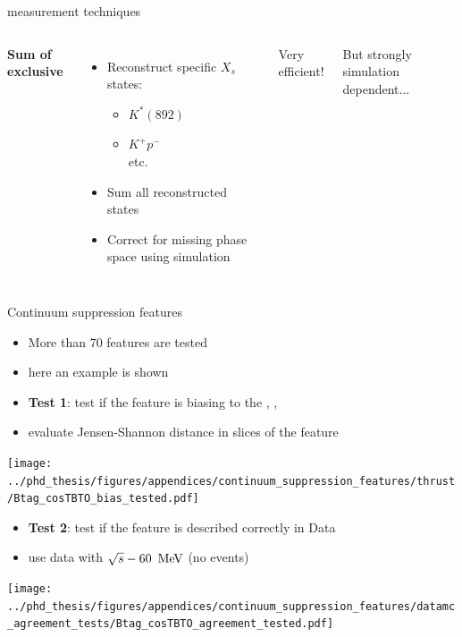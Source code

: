 \documentclass[xcolor=dvipsnames]{beamer}
\begin{document}
\begin{frame}{\safeBtoXsgamma measurement techniques}
   \scriptsize
   \begin{columns}
      \centering
      
      \centering
      \textbf{Sum of exclusive}
      \begin{itemize}
         \item Reconstruct specific $X_s$ states:
         \begin{itemize}
            \scriptsize
            \item $K^*(892)$
            \item $K^+p^-$\\
            etc.
         \end{itemize} 
         \item Sum all reconstructed states
         \item Correct for missing phase space using simulation
      \end{itemize}

      Very efficient!

      But strongly simulation dependent...


   \end{columns}



\end{frame}

\begin{frame}{Continuum suppression features}

   \scriptsize\centering

   \begin{itemize}
      \item More than 70 features are tested
      \item[\ra] here an example is shown
   \end{itemize}

   \begin{itemize}
      \item \textbf{Test 1}: test if the feature is biasing to the \EB, \Estar, \Mbc  
      \item[\ra] evaluate Jensen-Shannon distance in slices of the feature
   \end{itemize}

   \texttt{[image: ../phd\_thesis/figures/appendices/continuum\_suppression\_features/thrust/Btag\_cosTBTO\_bias\_tested.pdf]}


   \begin{itemize}
      \item \textbf{Test 2}: test if the feature is described correctly in Data
      \item[\ra] use data with $\sqrt{s}-60~\mathrm{\,Me\kern -0.1em V}$ (no \FourS events)
   \end{itemize}



   \texttt{[image: ../phd\_thesis/figures/appendices/continuum\_suppression\_features/datamc\_agreement\_tests/Btag\_cosTBTO\_agreement\_tested.pdf]}

\end{frame}
\end{document}
